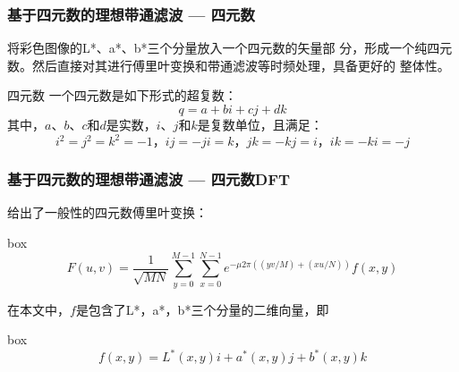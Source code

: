 \documentclass[xcolor=svgnames,serif,table,10pt]{beamer}
\begin{document}
\begin{frame}
  \frametitle{基于四元数的理想带通滤波 --- 四元数}
  将彩色图像的L*、a*、b*三个分量放入一个四元数\cite{hamilton1866elements}的矢量部
分，形成一个纯四元数。然后直接对其进行傅里叶变换和带通滤波等时频处理，具备更好的
整体性。

\medskip

\medskip
\begin{block}{四元数}
  一个四元数是如下形式的超复数：
  \begin{equation}
    \label{eq:quaternion}
    q=a+bi+cj+dk
  \end{equation}
  其中，$a$、$b$、$c$和$d$是实数，$i$、$j$和$k$是复数单位，且满足：
  \begin{equation}
  \label{eq:ijk}
  i^2=j^2=k^2=-1\mbox{，}ij=-ji=k\mbox{，}jk=-kj=i\mbox{，}ik=-ki=-j
\end{equation}
\end{block}
\end{frame}

\begin{frame}
  \frametitle{基于四元数的理想带通滤波 --- 四元数DFT}
  \cite{sangwine2000discrete}给出了一般性的四元数傅里叶变换：
  
  \medskip
\begin{beamercolorbox}[shadow=true,sep=0pt,rounded=true]{box}  
\begin{equation}
  \label{eq:quaternion-dft}
  F(u,v)=\frac{1}{\sqrt{MN}}\sum_{y=0}^{M-1}\sum_{x=0}^{N-1}e^{-\mu 2\pi((yv/M)+(xu/N))}f(x,y)
\end{equation}
\end{beamercolorbox}

  \medskip
在本文中，$f$是包含了L*，a*，b*三个分量的二维向量，即

  \medskip
\begin{beamercolorbox}[shadow=true,sep=0pt,rounded=true]{box}  
\begin{equation}
  \label{eq:quaternion-lab}
  f(x,y)=L^{*}(x,y)i+a^{*}(x,y)j+b^{*}(x,y)k
\end{equation}
\end{beamercolorbox}
\end{frame}
\end{document}
